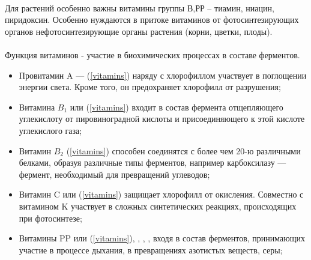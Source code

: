\paragraph*{}Для растений особенно важны витамины группы В,РР -- тиамин, ниацин, пиридоксин. Особенно нуждаются в притоке витаминов от фотосинтезирующих органов нефотосинтезирующие органы растения (корни, цветки, плоды).

\paragraph*{}Функция витаминов - участие в биохимических процессах в составе ферментов.

\begin{itemize}

	\item Провитамин A —  (\ris \ref{vitamins}) наряду с хлорофиллом участвует в поглощении энергии света. Кроме того, он предохраняет хлорофилл от разрушения;
	\item Витамина $B_{1}$ или  (\ris \ref{vitamins}) входит в состав фермента отщепляющего углекислоту от пировиноградной кислоты и присоединяющего к этой кислоте углекислого газа;
	\item Витамин $B_{2}$  (\ris \ref{vitamins}) способен соединятся с более чем 20-ю различными белками, образуя различные типы ферментов, например карбоксилазу — фермент, необходимый для превращений углеводов;
	\item Витамин C или  (\ris \ref{vitamins}) защищает хлорофилл от окисления. Совместно с витамином K участвует в сложных синтетических реакциях, происходящих при фотосинтезе;
	\item Витамины PP или  (\ris \ref{vitamins}), , , , входя в состав ферментов, принимающих участие в процессе дыхания, в превращениях азотистых веществ, серы;

\end{itemize}

